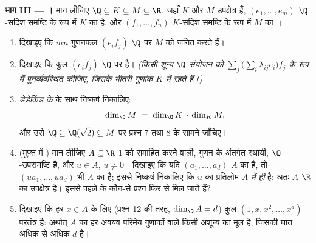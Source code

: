 \begin{problem}
\medskip \noindent\textbf{भाग III --- ।} मान लीजिए $\Q \subseteq K
\subseteq M \subseteq \R$, जहाँ $K$ और $M$ उपक्षेत्र हैं, $(e_1, \dots,
e_m)$ $\Q$-सदिश समष्टि के रूप में $K$ का  है, और $(f_1, \dots, f_n)$
$K$-सदिश समष्टि के रूप में $M$ का ।
\begin{enumerate}[resume]
  \item दिखाइए कि $mn$ गुणनफल $(e_i f_j)$ $\Q$ पर $M$ को जनित करते हैं।
  \item दिखाइए कि कुल $(e_i f_j)$ $\Q$ पर  है। \emph{(किसी शून्य
  $\Q$-संयोजन को $\sum_j \bigl(\sum_i \lambda_{ij} e_i\bigr) f_j$ के रूप में
  पुनर्व्यवस्थित कीजिए, जिसके भीतरी गुणांक $K$ में रहते हैं।)}
  \item \emph{डेडेकिंड के } के साथ निष्कर्ष निकालिए:
        \[
        \dim_\Q M \;=\; \dim_\Q K \,\cdot\, \dim_K M ,
        \]
        और उसे $\Q \subseteq \Q(\sqrt2) \subseteq M$ पर प्रश्न 7 तथा 8 के
        सामने जाँचिए।
  \item (मुफ़्त में ) मान लीजिए $A \subseteq \R$ $1$ को समाहित करने
  वाली, गुणन के अंतर्गत स्थायी,  $\Q$-उपसमष्टि है, और $u \in A$,
  $u \neq 0$। दिखाइए कि यदि $(a_1, \dots, a_d)$ $A$ का  है, तो $(u a_1,
  \dots, u a_d)$ भी $A$ का  है; इससे निष्कर्ष निकालिए कि $u$ का प्रतिलोम
  \emph{$A$ में ही} है: अतः $A$ $\R$ का उपक्षेत्र है। इससे पहले के कौन-से
  प्रश्न फिर से मिल जाते हैं?
  \item दिखाइए कि हर $x \in A$ के लिए (प्रश्न 12 की तरह, $\dim_\Q A = d$)
  कुल $(1, x, x^2, \dots, x^{d})$ परतंत्र है: अर्थात् $A$ का हर अवयव परिमेय
  गुणांकों वाले किसी अशून्य  का मूल है, जिसकी घात अधिक से अधिक $d$ है।
\end{enumerate}


\end{problem}
